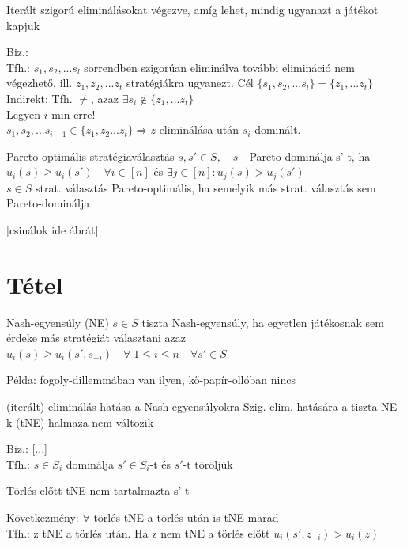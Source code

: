 \begin{theorem}{}{}
	Iterált szigorú eliminálásokat végezve, amíg lehet, mindig ugyanazt a játékot kapjuk
\end{theorem}
Biz.:\\
Tfh.: $s_1, s_2, ... s_l$ sorrendben szigorúan eliminálva további elimináció nem végezhető, ill. $z_1, z_2, ... z_t$ stratégiákra ugyanezt. Cél $\{ s_1, s_2, ... s_l\} = \{z_1, ... z_t\}$\\
Indirekt: Tfh. $\neq$, azaz  $\exists s_i \notin \{z_1, ... z_t\}$\\
Legyen $i$ min erre!\\
$s_1, s_2, ... s_{i-1} \in \{z_1, z_2 ... z_t\} \Longrightarrow z$ eliminálása után $s_i$ dominált.

\begin{definition}{Pareto-optimális stratégiaválasztás}{}
	$s, s' \in S, \quad s \quad$Pareto-dominálja s'-t, ha $u_i(s) \geq u_i(s') \quad \forall i \in [n]$ és $\exists j \in [n] : u_j(s) > u_j(s')$\\
	$s \in S$ strat. választás Pareto-optimális, ha semelyik más strat. választás sem Pareto-dominálja
\end{definition}

[csinálok ide ábrát]

\newpage
\section{Tétel}
\begin{definition}{Nash-egyensúly (NE)}{}
	$s \in S$ tiszta Nash-egyensúly, ha egyetlen játékosnak sem érdeke más stratégiát választani azaz $u_i(s) \geq u_i(s',s_{-i}) \quad \forall \; 1 \leq i \leq n \quad \forall s' \in S$
\end{definition}
Példa: fogoly-dillemmában van ilyen, kő-papír-ollóban nincs

\begin{theorem}{(iterált) eliminálás
		hatása a Nash-egyensúlyokra}{}
	Szig. elim. hatására a tiszta NE-k (tNE) halmaza nem változik
\end{theorem}
Biz.: [...] \\
Tfh.: $s \in S_i$ dominálja $s' \in S_i$-t és $s'$-t töröljük

\begin{observation}{}{}
	Törlés előtt tNE nem tartalmazta s'-t 
\end{observation}
Következmény: $\forall$ törlés tNE a törlés után is tNE marad \\
Tfh.: z tNE a törlés után. Ha z nem tNE a törlés előtt $u_i(s', z_{-i}) > u_i(z)$

